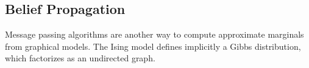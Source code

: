 \documentclass{article}
\begin{document}
\subsection{Belief Propagation}

Message passing algorithms are another way to compute approximate marginals from 
graphical models. 
The Ising model defines implicitly a Gibbs distribution, which factorizes as an 
undirected graph. 


\newpage



\end{document}
